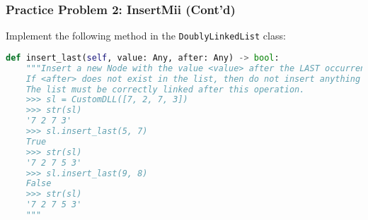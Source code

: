 \documentclass[hyperref={colorlinks,citecolor=blue,linkcolor=blue,urlcolor=blue}, aspectratio=1610]{beamer}
\begin{document}
\begin{frame}[fragile]
  \frametitle{Practice Problem 2: InsertMii (Cont'd)}
  Implement the following method in the \texttt{DoublyLinkedList} class:

  \begin{lstlisting}[language=Python, style=mystyle]
def insert_last(self, value: Any, after: Any) -> bool:
    """Insert a new Node with the value <value> after the LAST occurrence of the value <after> in this list.
    If <after> does not exist in the list, then do not insert anything and return False.
    The list must be correctly linked after this operation.
    >>> sl = CustomDLL([7, 2, 7, 3])
    >>> str(sl) 
    '7 2 7 3'
    >>> sl.insert_last(5, 7)
    True
    >>> str(sl)
    '7 2 7 5 3'
    >>> sl.insert_last(9, 8)
    False
    >>> str(sl)
    '7 2 7 5 3'
    """
\end{lstlisting}
\end{frame}
\end{document}
